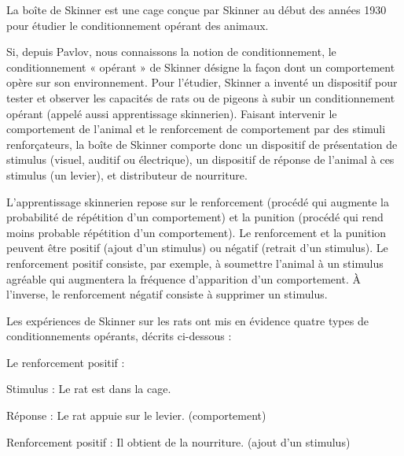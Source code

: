 La boîte de Skinner est une cage conçue par Skinner au début des années 1930 pour étudier le conditionnement opérant des animaux.\par


Si, depuis Pavlov, nous connaissons la notion de conditionnement, le conditionnement « opérant » de Skinner désigne la façon dont un comportement opère sur son environnement. Pour l’étudier, Skinner a inventé un dispositif pour tester et observer les capacités de rats ou de pigeons à subir un conditionnement opérant (appelé aussi apprentissage skinnerien). Faisant intervenir le comportement de l’animal et le renforcement de comportement par des stimuli renforçateurs, la boîte de Skinner comporte donc un dispositif de présentation de stimulus (visuel, auditif ou électrique), un dispositif de réponse de l’animal à ces stimulus (un levier), et distributeur de nourriture.\par


L'apprentissage skinnerien repose sur le renforcement (procédé qui augmente la probabilité de répétition d’un comportement) et la punition (procédé qui rend moins probable répétition d’un comportement). Le renforcement et la punition peuvent être positif (ajout d’un stimulus) ou négatif (retrait d’un stimulus). Le renforcement positif consiste, par exemple, à soumettre l’animal à un stimulus agréable qui augmentera la fréquence d’apparition d’un comportement. À l'inverse, le renforcement négatif consiste à supprimer un stimulus.\par


Les expériences de Skinner sur les rats ont mis en évidence quatre types de conditionnements opérants, décrits ci-dessous :\par

Le renforcement positif :\par

Stimulus : Le rat est dans la cage.\par

Réponse : Le rat appuie sur le levier. (comportement)\par

Renforcement positif : Il obtient de la nourriture. (ajout d’un stimulus)\par

